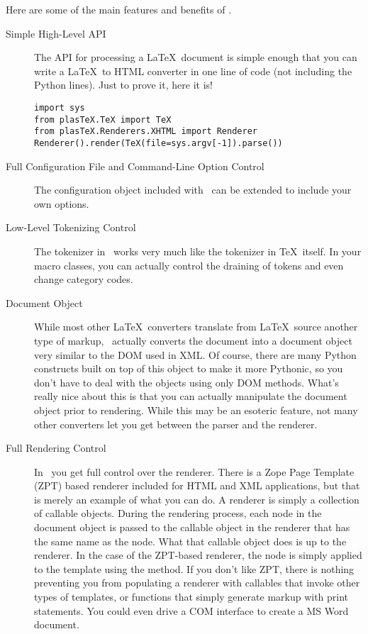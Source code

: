Here are some of the main features and benefits of \plasTeX.
\begin{description}
\item[Simple High-Level API] The API for processing a \LaTeX\ document
is simple enough that you can write a \LaTeX\ to HTML converter
in one line of code (not including the Python  lines).
Just to prove it, here it is!
\begin{verbatim}
import sys
from plasTeX.TeX import TeX
from plasTeX.Renderers.XHTML import Renderer
Renderer().render(TeX(file=sys.argv[-1]).parse())
\end{verbatim}

\item[Full Configuration File and Command-Line Option Control]
The configuration object included with \plasTeX\ can be extended to include
your own options.

\item[Low-Level Tokenizing Control] The tokenizer in \plasTeX\ works very 
much like the tokenizer in \TeX\ itself.  In your macro classes, you 
can actually control the draining of tokens and even change category codes.

\item[Document Object] While most other \LaTeX\ converters translate from
\LaTeX\ source another type of markup, \plasTeX\ actually converts the 
document into a document object very similar to the DOM used in XML.
Of course, there are many Python constructs built on top of this object
to make it more Pythonic, so you don't have to deal with the objects using
only DOM methods. What's really nice about this is that you can actually 
manipulate the document object prior to rendering.  While this may be an
esoteric feature, not many other converters let you get between the parser
and the renderer.

\item[Full Rendering Control] In \plasTeX\, you get full control over the
renderer.  There is a Zope Page Template (ZPT) based renderer included for HTML
and XML applications, but that is merely an example of what you can do.
A renderer is simply a collection of callable objects.  During the rendering
process, each node in the document object is passed to the callable object 
in the renderer that has the same name as the node.  What that callable object
does is up to the renderer.  In the case of the ZPT-based renderer, the 
node is simply applied to the template using the  method.
If you don't like ZPT, there is nothing preventing you from populating
a renderer with callables that invoke other types of templates, or functions
that simply generate markup with print statements.  You could even drive
a COM interface to create a MS Word document.
\end{description}
